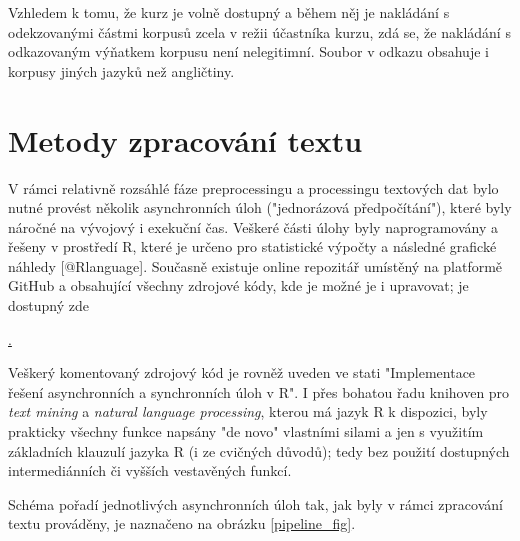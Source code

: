 Vzhledem k tomu, že kurz je volně dostupný a během něj je nakládání s odekzovanými částmi korpusů zcela v režii účastníka kurzu, zdá se, že nakládání s odkazovaným výňatkem korpusu není nelegitimní. Soubor v odkazu obsahuje i korpusy jiných jazyků než angličtiny.



\section{Metody zpracování textu}

V rámci relativně rozsáhlé fáze preprocessingu a processingu textových dat bylo nutné provést několik asynchronních úloh ("jednorázová předpočítání"), které byly náročné na vývojový i exekuční čas. Veškeré části úlohy byly naprogramovány a řešeny v prostředí \textsf{R}, které je určeno pro statistické výpočty a následné grafické náhledy [@Rlanguage]. Současně existuje online repozitář umístěný na platformě \textsf{GitHub} a obsahující všechny zdrojové kódy, kde je možné je i upravovat; je dostupný zde

\begin{center}
\href{https://github.com/LStepanek/4IZ470\_Dolovani\_znalosti\_z\_webu/tree/master/seminarni\_prace/}{.}
\end{center}


Veškerý komentovaný zdrojový kód je rovněž uveden ve stati "Implementace řešení asynchronních a synchronních úloh v \textsf{R}". I přes bohatou řadu knihoven pro \textit{text mining} a \textit{natural language processing}, kterou má jazyk \textsf{R} k dispozici, byly prakticky všechny funkce napsány "de novo" vlastními silami a jen s využitím základních klauzulí jazyka \textsf{R} (i ze cvičných důvodů); tedy bez použití dostupných intermediánních či vyšších vestavěných funkcí.

Schéma pořadí jednotlivých asynchronních úloh tak, jak byly v rámci zpracování textu prováděny, je naznačeno na obrázku \ref{pipeline_fig}.

